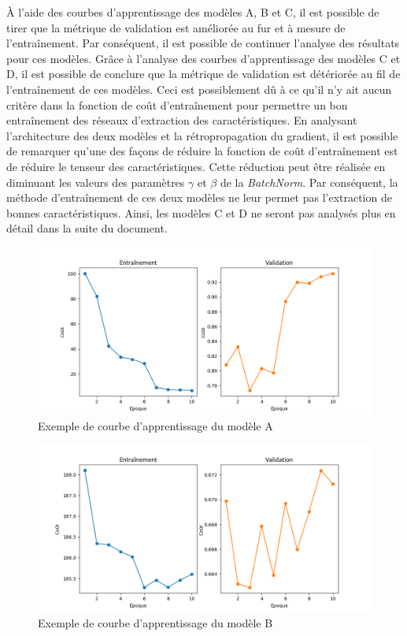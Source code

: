     À l'aide des courbes d'apprentissage des modèles A, B et C, il est possible de tirer que la métrique de validation est améliorée au fur et à mesure de l'entraînement. Par conséquent, il est possible de continuer l'analyse des résultats pour ces modèles. Grâce à l'analyse des courbes d'apprentissage des modèles C et D, il est possible de conclure que la métrique de validation est détériorée au fil de l'entraînement de ces modèles. Ceci est possiblement dû à ce qu'il n'y ait aucun critère dans la fonction de coût d'entraînement pour permettre un bon entraînement des réseaux d'extraction des caractéristiques. En analysant l'architecture des deux modèles et la rétropropagation du gradient, il est possible de remarquer qu'une des façons de réduire la fonction de coût d'entraînement est de réduire le tenseur des caractéristiques. Cette réduction peut être réalisée en diminuant les valeurs des paramètres \(\gamma\) et \(\beta\) de la \textit{BatchNorm}. Par conséquent, la méthode d'entraînement de ces deux modèles ne leur permet pas l'extraction de bonnes caractéristiques. Ainsi, les modèles C et D ne seront pas analysés plus en détail dans la suite du document.

    \begin{figure}
        \centering
        \includegraphics[width=16cm]{images/learning_curves_a.png}
        \caption{Exemple de courbe d'apprentissage du modèle A}
        \label{fig:learning_curves_a}
    \end{figure}

    \begin{figure}
        \centering
        \includegraphics[width=16cm]{images/learning_curves_b.png}
        \caption{Exemple de courbe d'apprentissage du modèle B}
        \label{fig:learning_curves_b}
    \end{figure}

